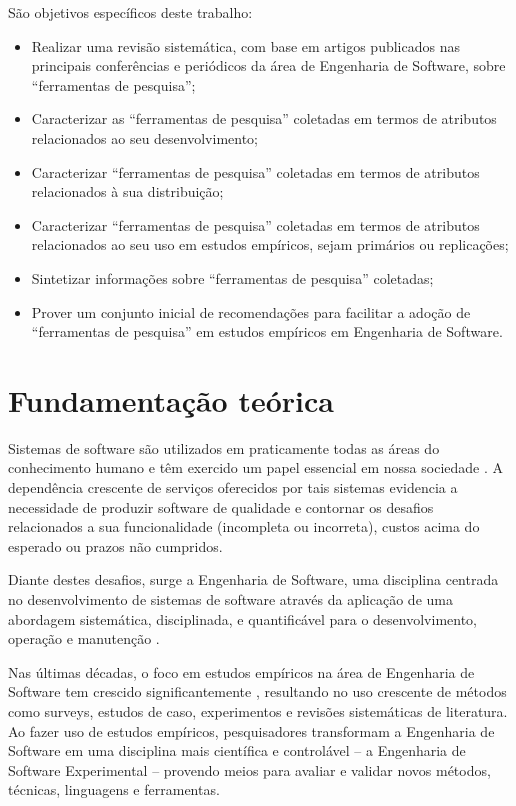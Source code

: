 \documentclass[12pt]{article}
\begin{document}
São objetivos específicos deste trabalho:

\begin{itemize}
  \item Realizar uma revisão sistemática, com base em artigos publicados nas
    principais conferências e periódicos da área de Engenharia de Software,
    sobre “ferramentas de pesquisa”;
  \item Caracterizar as “ferramentas de pesquisa” coletadas em termos de
    atributos relacionados ao seu desenvolvimento;
  \item Caracterizar  “ferramentas de pesquisa” coletadas em termos de
    atributos relacionados à sua distribuição;
  \item Caracterizar “ferramentas de pesquisa” coletadas  em termos de
    atributos relacionados ao seu uso em estudos empíricos, sejam primários ou
    replicações;
  \item Sintetizar informações sobre “ferramentas de pesquisa” coletadas;
  \item Prover um conjunto inicial de recomendações para facilitar a adoção de
    “ferramentas de pesquisa”  em estudos empíricos em Engenharia de Software. 
\end{itemize}

\section{Fundamentação teórica}

Sistemas de software são utilizados em praticamente todas as áreas do
conhecimento humano e têm exercido um papel essencial em nossa sociedade
\cite{Mafra2006}. A dependência crescente de serviços oferecidos por tais
sistemas evidencia a necessidade de produzir software de qualidade e contornar
os  desafios relacionados a sua funcionalidade (incompleta ou incorreta),
custos acima do esperado ou prazos não cumpridos.

Diante destes desafios, surge a Engenharia de Software, uma disciplina
centrada no desenvolvimento de sistemas de software \cite{Wohlin2012} através
da aplicação de uma abordagem sistemática, disciplinada, e quantificável para
o desenvolvimento, operação e manutenção \cite{SWEBOK2014}.

Nas últimas décadas, o foco em estudos empíricos na área de Engenharia de
Software tem crescido significantemente \cite{Stol2015}, resultando no uso
crescente de métodos como surveys, estudos de caso, experimentos e revisões
sistemáticas de literatura. Ao fazer uso de estudos empíricos, pesquisadores
transformam a Engenharia de Software em uma disciplina mais científica e
controlável -- a  Engenharia de Software Experimental -- provendo meios para
avaliar e validar novos métodos, técnicas, linguagens e ferramentas.
\end{document}
